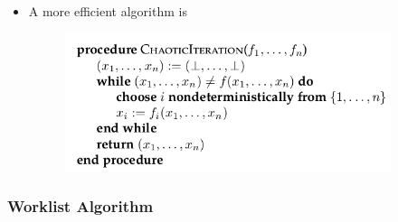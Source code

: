 \begin{itemize}
  \item A more efficient algorithm is 
  \begin{figure}[H]
  	\centering
  	\includegraphics[width=270pt]{img/monotone/chaotic}
  \end{figure}
\end{itemize}

\subsubsection{Worklist Algorithm}

